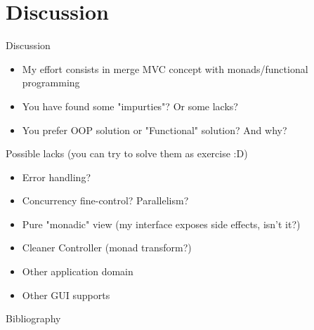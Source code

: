 \documentclass[presentation]{beamer}
\begin{document}
\section{Discussion}
\begin{frame}[fragile]{Discussion}

\begin{itemize}
  \item My effort consists in merge MVC concept with monads/functional programming
  \item You have found some "impurties"? Or some lacks?
  \item You prefer OOP solution or "Functional" solution? And why?
\end{itemize}

\begin{block}{Possible lacks (you can try to solve them as exercise :D)}
\begin{itemize}
  \item Error handling? 
  \item Concurrency fine-control? Parallelism?
  \item Pure "monadic" view (my interface exposes side effects, isn't it?)
  \item Cleaner Controller (monad transform?)
  \item Other application domain
  \item Other GUI supports
\end{itemize}
\end{block}
\end{frame}


\begin{frame}[allowframebreaks]{Bibliography}
\def\bibfont{\footnotesize}
\printbibliography
\end{frame}
\end{document}

